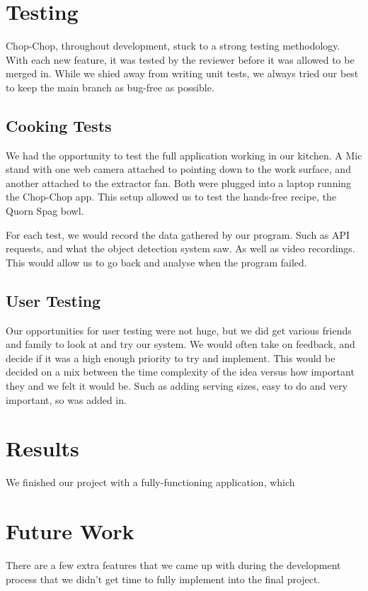 \documentclass{article}
\begin{document}
\section{Testing}
Chop-Chop, throughout development, stuck to a strong testing methodology. With each new feature, it was tested by the reviewer before it was allowed to be merged in. While we shied away from writing unit tests, we always tried our best to keep the main branch as bug-free as possible. 

\subsection{Cooking Tests}
We had the opportunity to test the full application working in our kitchen. A Mic stand with one web camera attached to pointing down to the work surface, and another attached to the extractor fan. Both were plugged into a laptop running the Chop-Chop app. This setup allowed us to test the hands-free recipe, the Quorn Spag bowl.

For each test, we would record the data gathered by our program. Such as API requests, and what the object detection system saw. As well as video recordings. This would allow us to go back and analyse when the program failed. 

\subsection{User Testing}
Our opportunities for user testing were not huge, but we did get various friends and family to look at and try our system. We would often take on feedback, and decide if it was a high enough priority to try and implement. This would be decided on a mix between the time complexity of the idea versus how important they and we felt it would be. Such as adding serving sizes, easy to do and very important, so was added in.

\section{Results}
We finished our project with a fully-functioning application, which

\section{Future Work}
There are a few extra features that we came up with during the development process that we didn’t get time to fully implement into the final project.
\end{document}
